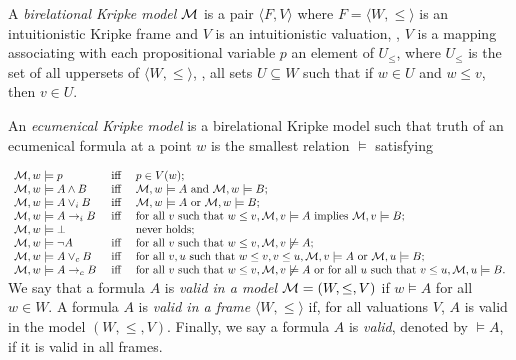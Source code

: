 \begin{definition}\label{def:ekripke} 
A {\em birelational Kripke model} $\mathcal{M}$ is a pair $\langle F,V\rangle$ where $F=\langle W,\leq\rangle$ is an intuitionistic Kripke frame and $V$ is an intuitionistic valuation, \ie, $V$ is a mapping associating with each propositional variable $p$ an element of $U_{\leq}$, where $U_{\leq}$ is the set of all uppersets of $\langle W,\leq\rangle$, \ie, all sets $U\subseteq W$ such that if $w\in U$ and $w\leq v$, then $v\in U$.

An {\em ecumenical Kripke model} is a birelational Kripke model such that truth of an ecumenical formula at a point $w$ is the
smallest relation $\models$ satisfying 

\noindent
$
\begin{array}{l@{\quad}c@{\quad}l}
\m,w\models p & \mbox{ iff } & p\in \val(w);\\
\m,w\models A\wedge B & \mbox{ iff } & \m,w\models A \mbox{ and } \m,w\models B;\\
\m,w\models A\vee_i B & \mbox{ iff } & \m,w\models A \mbox{ or } \m,w\models B;\\
\m,w\models A\iimp B & \mbox{ iff } & \text{for all } v \text{ such that  }w \leq v, \m,v\models A \mbox{ implies }  \m,v\models B;\\
\m,w \models \bot & & \mbox{never holds};\\
\m,w\models \neg A & \mbox{ iff } &    \text{for all } v \text{ such that  }w \leq v, \m,v\not\models A ;\\
\m,w\models A\vee_c B & \mbox{ iff } & \text{for all } v,u \text{ such that  }w \leq v,v \leq u, \m,v\models A \mbox{ or } \m,u\models B;\\
\m,w\models A\cimp B & \mbox{ iff } & \text{for all } v \text{ such that  }w \leq v, \m,v\not\models A \mbox{ or } \text{for all } u \text{ such that  }v \leq u, \m,u\models B.
\end{array}
$
We say that a formula $A$ is {\em valid in a model} $\mathcal{M}=(W,\leq,V)$ if $w\models A$ for all $w\in  W$. A formula $A$ is {\em valid in a frame} $\langle W,\leq\rangle$ if, for all valuations $V$, $A$ is valid in the model $(W,\leq,V)$. Finally, we say a formula $A$ is {\em valid}, denoted by $\models A$, if it is valid in all frames.
\end{definition}



